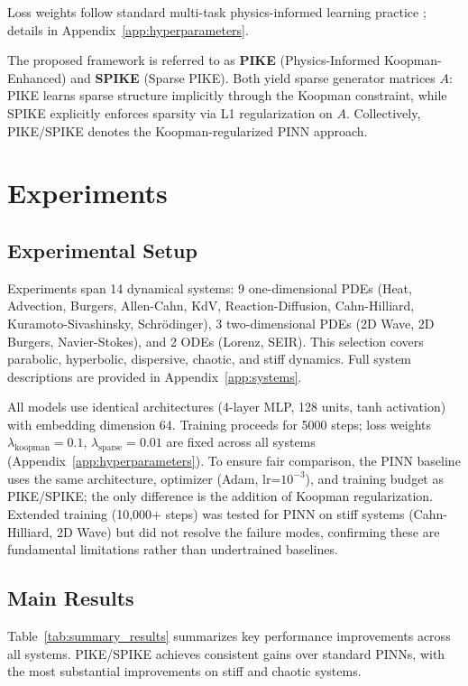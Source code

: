 \documentclass{article}
\theoremstyle{remark}
\begin{document}
Loss weights follow standard multi-task physics-informed learning practice \citep{wang2021understanding}; details in Appendix~\ref{app:hyperparameters}.

The proposed framework is referred to as \textbf{PIKE} (Physics-Informed Koopman-Enhanced) and \textbf{SPIKE} (Sparse PIKE). Both yield sparse generator matrices $A$: PIKE learns sparse structure implicitly through the Koopman constraint, while SPIKE explicitly enforces sparsity via L1 regularization on $A$. Collectively, PIKE/SPIKE denotes the Koopman-regularized PINN approach.

\section{Experiments}
\label{sec:experiments}

\subsection{Experimental Setup}

Experiments span 14 dynamical systems: 9 one-dimensional PDEs (Heat, Advection, Burgers, Allen-Cahn, KdV, Reaction-Diffusion, Cahn-Hilliard, Kuramoto-Sivashinsky, Schr\"odinger), 3 two-dimensional PDEs (2D Wave, 2D Burgers, Navier-Stokes), and 2 ODEs (Lorenz, SEIR). This selection covers parabolic, hyperbolic, dispersive, chaotic, and stiff dynamics. Full system descriptions are provided in Appendix~\ref{app:systems}.

All models use identical architectures (4-layer MLP, 128 units, tanh activation) with embedding dimension 64. Training proceeds for 5000 steps; loss weights $\lambda_{\text{koopman}} = 0.1$, $\lambda_{\text{sparse}} = 0.01$ are fixed across all systems (Appendix~\ref{app:hyperparameters}). To ensure fair comparison, the PINN baseline uses the same architecture, optimizer (Adam, lr=$10^{-3}$), and training budget as PIKE/SPIKE; the only difference is the addition of Koopman regularization. Extended training (10,000+ steps) was tested for PINN on stiff systems (Cahn-Hilliard, 2D Wave) but did not resolve the failure modes, confirming these are fundamental limitations rather than undertrained baselines.

\subsection{Main Results}

Table~\ref{tab:summary_results} summarizes key performance improvements across all systems. PIKE/SPIKE achieves consistent gains over standard PINNs, with the most substantial improvements on stiff and chaotic systems.
\end{document}
